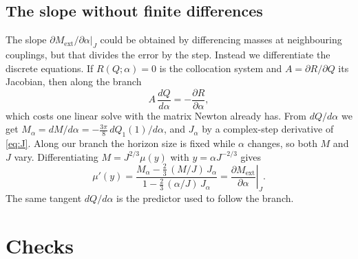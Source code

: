 \documentclass[11pt,a4paper]{article}
\newcommand{\ext}{\mathrm{ext}}
\begin{document}
\subsection{The slope without finite differences}

The slope $\partial M_\ext/\partial\alpha|_J$ could be obtained by differencing
masses at neighbouring couplings, but that divides the error by the step. Instead
we differentiate the discrete equations. If $R(Q;\alpha)=0$ is the collocation
system and $A=\partial R/\partial Q$ its Jacobian, then along the branch
\begin{equation}
  A\,\frac{dQ}{d\alpha}=-\frac{\partial R}{\partial\alpha},
  \label{eq:implicit}
\end{equation}
which costs one linear solve with the matrix Newton already has. From
$dQ/d\alpha$ we get $M_\alpha=dM/d\alpha=-\tfrac{3\pi}{8}\,dQ_1(1)/d\alpha$, and
$J_\alpha$ by a complex-step derivative of \eqref{eq:J}. Along our branch the
horizon size is fixed while $\alpha$ changes, so both $M$ and $J$ vary.
Differentiating $M=J^{2/3}\mu(y)$ with $y=\alpha J^{-2/3}$ gives
\begin{equation}
  \mu'(y)=\frac{M_\alpha-\tfrac23\,(M/J)\,J_\alpha}{1-\tfrac23\,(\alpha/J)\,J_\alpha}
  =\left.\frac{\partial M_\ext}{\partial\alpha}\right|_J .
  \label{eq:slope}
\end{equation}
The same tangent $dQ/d\alpha$ is the predictor used to follow the branch.

\section{Checks}
\label{sec:checks}
\end{document}
